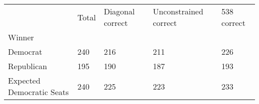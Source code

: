 \begin{tabular}{lllll}
\toprule
{} & Total & Diagonal correct & Unconstrained correct & 538 correct \\
Winner                             &       &                  &                       &             \\
\midrule
Democrat                           &   240 &              216 &                   211 &         226 \\
Republican                         &   195 &              190 &                   187 &         193 \\
\midrule Expected Democratic Seats &   240 &              225 &                   223 &         233 \\
\bottomrule
\end{tabular}

